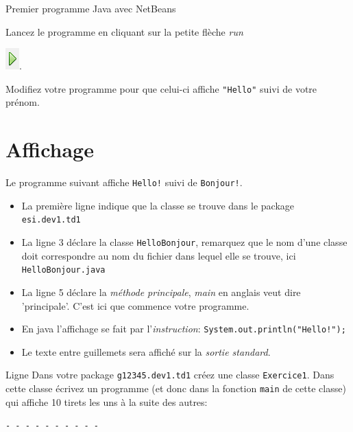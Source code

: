 \documentclass[a4paper,11pt]{article}
\begin{document}
\begin{Tutoriel}{Premier programme Java avec NetBeans}
\begin{steps}
		\item Lancez le programme en cliquant sur la petite flèche \emph{run} 
			
			\includegraphics{images/nb_newproject_run}.

		\item Modifiez votre programme pour que celui-ci affiche \texttt{"Hello"} suivi de votre prénom.

	\end{steps}

	\end{Tutoriel}

\section{Affichage}

	Le programme suivant affiche \texttt{Hello!} suivi de \texttt{Bonjour!}.

	\begin{itemize}
		\item La première ligne indique que la classe se trouve dans le package \texttt{esi.dev1.td1}
		\item La ligne 3 déclare la classe \texttt{HelloBonjour}, remarquez que le nom d'une classe 
			doit correspondre au nom du fichier dans lequel elle se trouve, ici \texttt{HelloBonjour.java}
		\item La ligne 5 déclare la \emph{méthode principale}, \emph{main} en anglais veut dire 'principale'.
			C'est ici que commence votre programme.
		\item En java l'affichage se fait par l'\emph{instruction}: \texttt{System.out.println("Hello!");}
		\item Le texte entre guillemets sera affiché sur la \emph{sortie standard}.
	\end{itemize}


	\begin{Exercice}{Ligne}
		Dans votre package \texttt{g12345.dev1.td1} créez une classe \texttt{Exercice1}.
		Dans cette classe écrivez un programme  (et donc dans la fonction \texttt{main} de cette classe) 
		qui affiche 10 tirets les uns à la suite des autres:

		\texttt{- - - - - - - - - -}
	\end{Exercice}
	
\end{document}
